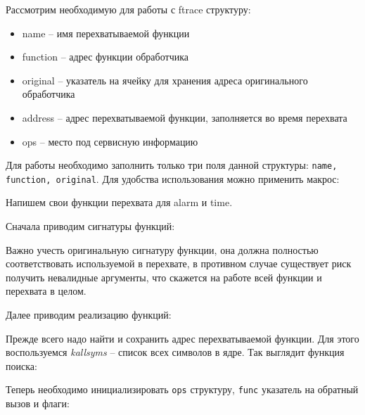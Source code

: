 \par Рассмотрим необходимую для работы с ftrace структуру:



\begin{itemize}
	\item name -- имя перехватываемой функции
	\item function -- адрес функции обработчика 
	\item original -- указатель на ячейку для хранения адреса оригинального обработчика
	\item address -- адрес перехватываемой функции, заполняется во время перехвата
	\item ops -- место под сервисную информацию
\end{itemize}

\par Для работы необходимо заполнить только три поля данной структуры: \lstinline|name, function, original|. Для удобства использования можно применить макрос:



\par Напишем свои функции перехвата для alarm и time.

\par Сначала приводим сигнатуры функций:


\par Важно учесть оригинальную сигнатуру функции, она должна полностью соответствовать используемой в перехвате, в противном случае существует риск получить невалидные аргументы, что скажется на работе всей функции и перехвата в целом.

\par Далее приводим реализацию функций:



\par Прежде всего надо найти и сохранить адрес перехватываемой функции. Для этого воспользуемся \textit{kallsyms} -- список всех символов в ядре. Так выглядит функция поиска:



\par Теперь необходимо инициализировать \lstinline|ops| структуру, \lstinline|func| указатель на обратный вызов и флаги: 

